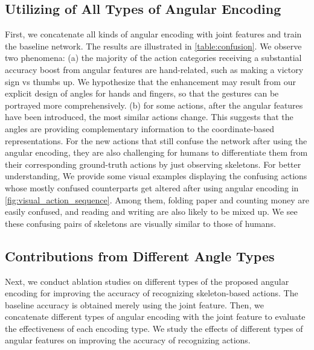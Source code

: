 \documentclass[journal,comsoc]{IEEEtran}
\begin{document}
\subsection{Utilizing of All Types of Angular Encoding}
First, we concatenate all kinds of angular encoding with joint features and train the baseline network. The results are illustrated in \autoref{table:confusion}.  
We observe two phenomena: (a) the majority of the action categories receiving a substantial accuracy boost from angular features are hand-related, such as making a victory sign vs thumbs up. We hypothesize that the enhancement may result from our explicit design of angles for hands and fingers, so that the gestures can be portrayed more comprehensively. (b) for some actions, after the angular features have been introduced, the most similar actions change. 
This suggests that the angles are providing complementary information to the coordinate-based representations. For the new actions that still confuse the network after using the angular encoding, they are also challenging for humans to differentiate them from their corresponding ground-truth actions by just observing skeletons. 
For better understanding, 
We provide some visual examples displaying the confusing actions whose mostly confused counterparts get altered after using angular encoding in \autoref{fig:visual_action_sequence}. Among them, folding paper and counting money are easily confused, and reading and writing are also likely to be mixed up. 
We see these confusing pairs of skeletons are visually similar to those of humans. 

\subsection{Contributions from Different Angle Types }

Next, we conduct ablation studies on different types of the proposed angular encoding for improving the accuracy of recognizing skeleton-based actions. The baseline accuracy is obtained merely using the joint feature. Then, we concatenate different types of angular encoding with the joint feature to evaluate the effectiveness of each encoding type. We study the effects of different types of angular features on improving the accuracy of recognizing actions. 
\end{document}
